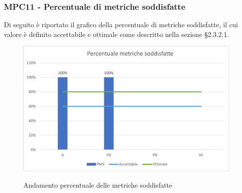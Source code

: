\subsubsection{MPC11 - Percentuale di metriche soddisfatte}
Di seguito è riportato il grafico della percentuale di metriche soddisfatte, il cui valore è definito accettabile e ottimale come descritto nella sezione §2.3.2.1.\\

\begin{figure}[H]
\centering
\includegraphics[scale=0.78]{res/ResocontoAttivitaDiVerifica/res/metriche/grafici/img/metricheSoddisfatte.png}\\
\caption{Andamento percentuale delle metriche soddisfatte}
\end{figure}

